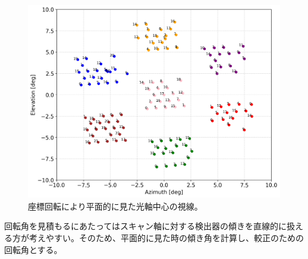 \begin{figure}[htbp]
  \centering
  \includegraphics[width=0.9\columnwidth]{5_alignment/figs/before_full_pos.png}
  \caption{座標回転により平面的に見た光軸中心の視線。}
  \label{before_full_pos_0}
\end{figure}
回転角を見積もるにあたってはスキャン軸に対する検出器の傾きを直線的に扱える方が考えやすい。そのため、平面的に見た時の傾き角を計算し、較正のための回転角とする。

